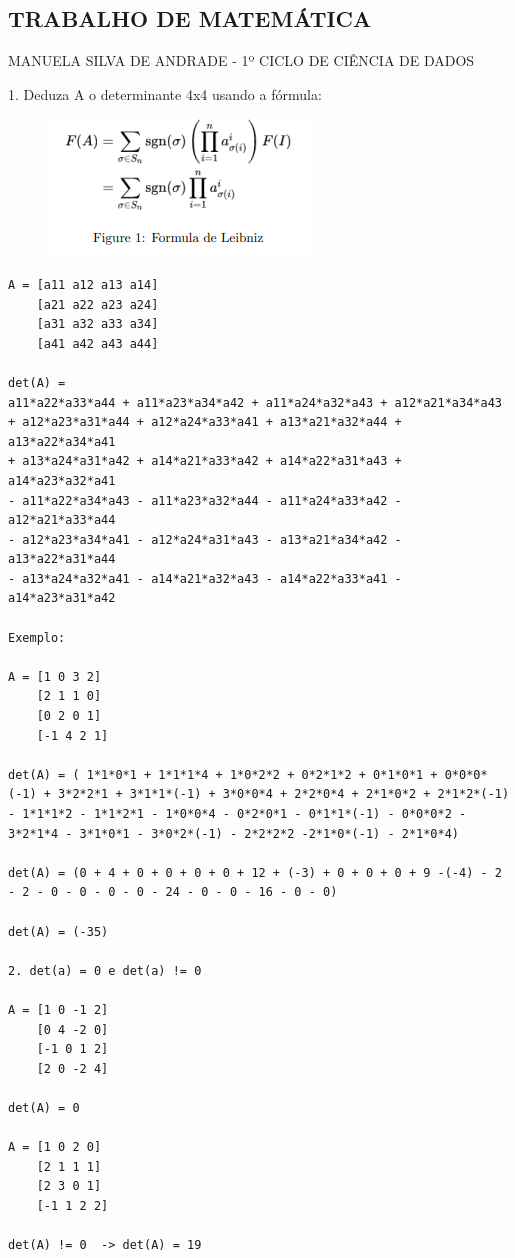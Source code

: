 \documentclass{article}
\begin{document}
\begin{center}

\subsection{TRABALHO DE MATEMÁTICA}

MANUELA SILVA DE ANDRADE - 1º CICLO DE CIÊNCIA DE DADOS

\end{center}


1. Deduza A o determinante 4x4 usando a fórmula:

\begin{figure}[h]
    \centering
    \includegraphics{Captura de tela 2023-05-09 075535.png}
    \label{fig:my_label}
\end{figure}

\begin{lstlisting}    
A = [a11 a12 a13 a14]
    [a21 a22 a23 a24]
    [a31 a32 a33 a34]
    [a41 a42 a43 a44]

det(A) =
a11*a22*a33*a44 + a11*a23*a34*a42 + a11*a24*a32*a43 + a12*a21*a34*a43
+ a12*a23*a31*a44 + a12*a24*a33*a41 + a13*a21*a32*a44 + a13*a22*a34*a41
+ a13*a24*a31*a42 + a14*a21*a33*a42 + a14*a22*a31*a43 + a14*a23*a32*a41
- a11*a22*a34*a43 - a11*a23*a32*a44 - a11*a24*a33*a42 - a12*a21*a33*a44
- a12*a23*a34*a41 - a12*a24*a31*a43 - a13*a21*a34*a42 - a13*a22*a31*a44
- a13*a24*a32*a41 - a14*a21*a32*a43 - a14*a22*a33*a41 - a14*a23*a31*a42

Exemplo:

A = [1 0 3 2]
    [2 1 1 0]
    [0 2 0 1]
    [-1 4 2 1]

det(A) = ( 1*1*0*1 + 1*1*1*4 + 1*0*2*2 + 0*2*1*2 + 0*1*0*1 + 0*0*0*(-1) + 3*2*2*1 + 3*1*1*(-1) + 3*0*0*4 + 2*2*0*4 + 2*1*0*2 + 2*1*2*(-1) - 1*1*1*2 - 1*1*2*1 - 1*0*0*4 - 0*2*0*1 - 0*1*1*(-1) - 0*0*0*2 - 3*2*1*4 - 3*1*0*1 - 3*0*2*(-1) - 2*2*2*2 -2*1*0*(-1) - 2*1*0*4)

det(A) = (0 + 4 + 0 + 0 + 0 + 0 + 12 + (-3) + 0 + 0 + 0 + 9 -(-4) - 2 - 2 - 0 - 0 - 0 - 0 - 24 - 0 - 0 - 16 - 0 - 0)

det(A) = (-35)

2. det(a) = 0 e det(a) != 0

A = [1 0 -1 2]
    [0 4 -2 0]
    [-1 0 1 2]
    [2 0 -2 4]
    
det(A) = 0

A = [1 0 2 0]
    [2 1 1 1]
    [2 3 0 1]
    [-1 1 2 2]
    
det(A) != 0  -> det(A) = 19

\end{lstlisting}
\end{document}
